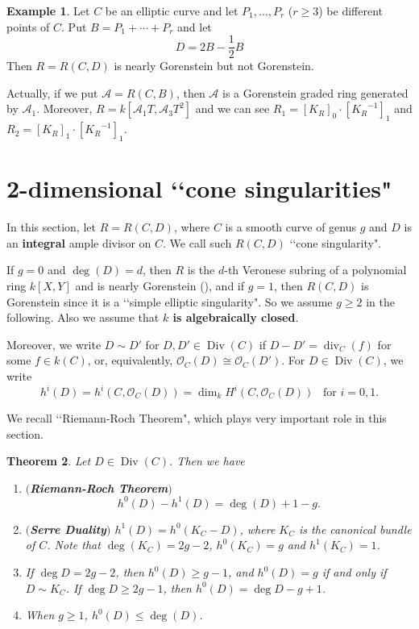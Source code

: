 \documentclass[12pt]{amsart}
\newtheorem{thm}{Theorem}[section]
\theoremstyle{definition}
\newtheorem{ex}[thm]{Example}
\theoremstyle{remark}
\numberwithin{equation}{section}
\DeclareMathOperator{\di}{div}
\DeclareMathOperator{\Div}{Div}
\newcommand{\KiR}{{K_R}^{-1}}
\newcommand{\cA}{\mathcal A}
\newcommand{\cO}{\mathcal O}
\renewcommand{\:}{\colon}
\begin{document}
\begin{ex}  
Let $C$ be an elliptic curve and 
let $P_1,\ldots, P_r$ ($r\ge 3$) be different points of $C$. 
Put $B=P_1+\cdots + P_r$ and let 
\[ 
D = 2B -\dfrac{1}{2} B 
\]
Then $R=R(C,D)$ is nearly Gorenstein but not Gorenstein.
\par
Actually, if we put $\cA = R(C,B)$, then $\cA$ is a Gorenstein graded ring generated by $\cA_1$.  
Moreover,  $R = k[ \cA_1T, \cA_3T^2]$ and we can see $R_1= [K_R]_0\cdot [\KiR]_1$ and 
$R_2 = [K_R]_1\cdot [\KiR]_1$. 
\end{ex}




\medskip
\section{2-dimensional \lq\lq cone singularities"}
\label{s:cone}


In this section, let $R=R(C,D)$, where $C$ is a smooth curve of genus $g$ and $D$ is an {\bf integral} ample divisor on $C$.  
We call such $R(C,D)$ \lq\lq cone singularity". 
\par 
If $g=0$ and $\deg(D)=d$, then $R$ is the $d$-th Veronese 
 subring of a polynomial ring $k[X,Y]$ and is nearly Gorenstein (\cite{HHS}), and if $g=1$, 
 then $R(C,D)$ is Gorenstein since it is a \lq\lq simple elliptic singularity". 
 So we assume $g\ge 2$ in the following.  
Also we assume that {\bf $k$ is algebraically closed}. 
\par 
Moreover, we write $D\sim D'$ for $D, D'\in \Div(C)$ if $D - D' = \di_C(f)$ for some $f\in k(C)$,
or, equivalently, $\cO_C(D)\cong \cO_C(D')$. 
For $D \in \Div(C)$, we write 
\[
h^i(D)= h^i(C,\cO_C(D))=\dim_k H^i(C,\cO_C(D)) \;\;\;\text{for $i=0,1$}. 
\]

\par 
We recall \lq\lq Riemann-Roch Theorem", 
which plays very important role in this 
section. 

\begin{thm}\label{RRTh} Let $D\in \Div(C)$. Then we have  
\begin{enumerate}
\item $($\textbf{Riemann-Roch Theorem}$)$
\[
h^0(D)-h^1(D)=\deg(D) +1-g.
\]
\item $($\textbf{Serre Duality}$)$ $h^1(D) = h^0(K_C-D)$, where $K_C$ is the canonical bundle of $C$. 
Note that $\deg(K_C)= 2g-2$, $h^0(K_C)=g$ and $h^1(K_C)=1$. 
\item If $\deg D = 2g-2$, then $h^0(D)\ge g-1$, 
and $h^0(D)=g$ if and only if $D\sim K_C$.
If $\deg D \ge 2g-1$, then $h^0(D)= \deg D - g+1$.  
\item When $g \ge 1$, $h^0(D) \le \deg(D)$. 
\end{enumerate}
\end{thm}
\end{document}
